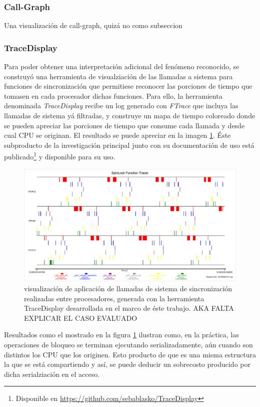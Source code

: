 \subsubsection{Call-Graph}
Una visualización de call-graph, quizá no como subseccion

\subsubsection{TraceDisplay}
Para poder obtener una interpretación adicional del fenómeno reconocido, se construyó una herramienta de visualziación de las llamadas a sistema para funciones de sincronización que permitiese reconocer las porciones de tiempo que tomasen en cada procesador dichas funciones. Para ello, la herramienta denominada \emph{TraceDisplay} recibe un log generado con \emph{FTrace} que incluya las llamadas de sistema yá filtradas, y construye un mapa de tiempo coloreado donde se pueden apreciar las porciones de tiempo que consume cada llamada y desde cual CPU se originan. El resultado se puede apreciar en la imagen \ref{fig:traceDisplay}. Éste subproducto de la investigación principal junto con su documentación de uso está publicado\footnote{Disponible en \url{https://github.com/sebablasko/TraceDisplay}} y disponible para su uso.

\begin{figure}[!h]
	\centering
	\includegraphics[scale=0.35]{imagenes/traceVisualization.png}
	\caption{visualización de aplicación de llamadas de sistema de sincronización realizadas entre procesadores, generada con la herramienta TraceDisplay desarrollada en el marco de éste trabajo. AKA FALTA EXPLICAR EL CASO EVALUADO}
	\label{fig:traceDisplay}
\end{figure}

Resultados como el mostrado en la figura \ref{fig:traceDisplay} ilustran como, en la práctica, las operaciones de bloqueo se terminan ejecutando serializadamente, aún cuando son distintos los CPU que los originen. Esto producto de que es una misma estructura la que se está compartiendo y así, se puede deducir un sobrecosto producido por dicha serialziación en el acceso.

